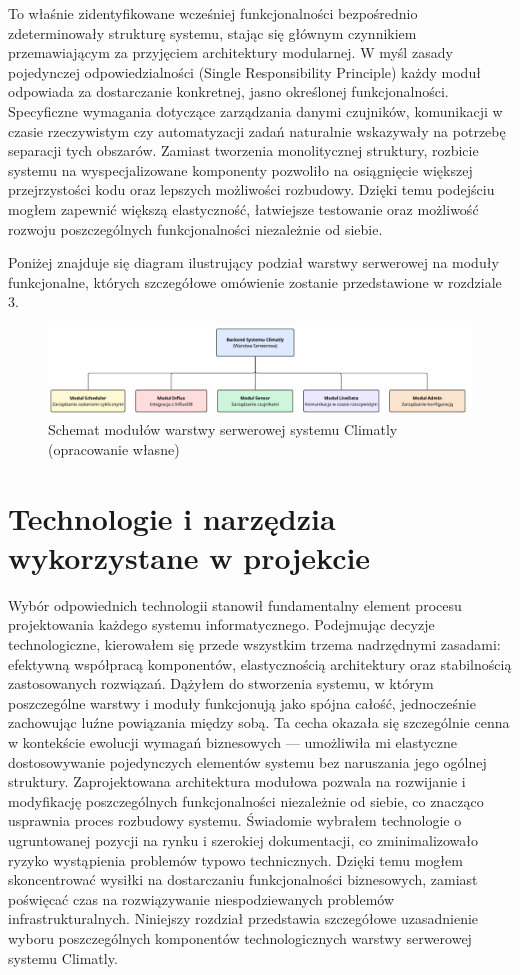 \documentclass[a4paper,12pt,openany]{book}
\begin{document}
To właśnie zidentyfikowane wcześniej funkcjonalności bezpośrednio zdeterminowały strukturę systemu, stając się głównym czynnikiem przemawiającym za przyjęciem architektury modularnej. W myśl zasady pojedynczej odpowiedzialności (Single Responsibility Principle) każdy moduł odpowiada za dostarczanie konkretnej, jasno określonej funkcjonalności. Specyficzne wymagania dotyczące zarządzania danymi czujników, komunikacji w czasie rzeczywistym czy automatyzacji zadań naturalnie wskazywały na potrzebę separacji tych obszarów. Zamiast tworzenia monolitycznej struktury, rozbicie systemu na wyspecjalizowane komponenty pozwoliło na osiągnięcie większej przejrzystości kodu oraz lepszych możliwości rozbudowy. Dzięki temu podejściu mogłem zapewnić większą elastyczność, łatwiejsze testowanie oraz możliwość rozwoju poszczególnych funkcjonalności niezależnie od siebie.

Poniżej znajduje się diagram ilustrujący podział warstwy serwerowej na moduły funkcjonalne, których szczegółowe omówienie zostanie przedstawione w rozdziale 3.

\begin{figure}[H]
    \centering
    \includegraphics[width=1\textwidth]{Climatly-modules.pdf}
    \caption{Schemat modułów warstwy serwerowej systemu Climatly (opracowanie własne)}
    \label{fig:moduly---systemu}
\end{figure}

\chapter{Technologie i narzędzia wykorzystane w projekcie}

Wybór odpowiednich technologii stanowił fundamentalny element procesu projektowania każdego systemu informatycznego. Podejmując decyzje technologiczne, kierowałem się przede wszystkim trzema nadrzędnymi zasadami: efektywną współpracą komponentów, elastycznością architektury oraz stabilnością zastosowanych rozwiązań.
Dążyłem do stworzenia systemu, w którym poszczególne warstwy i moduły funkcjonują jako spójna całość, jednocześnie zachowując luźne powiązania między sobą. Ta cecha okazała się szczególnie cenna w kontekście ewolucji wymagań biznesowych --- umożliwiła mi elastyczne dostosowywanie pojedynczych elementów systemu bez naruszania jego ogólnej struktury. Zaprojektowana architektura modułowa pozwala na rozwijanie i modyfikację poszczególnych funkcjonalności niezależnie od siebie, co znacząco usprawnia proces rozbudowy systemu.
Świadomie wybrałem technologie o ugruntowanej pozycji na rynku i szerokiej dokumentacji, co zminimalizowało ryzyko wystąpienia problemów typowo technicznych. Dzięki temu mogłem skoncentrować wysiłki na dostarczaniu funkcjonalności biznesowych, zamiast poświęcać czas na rozwiązywanie niespodziewanych problemów infrastrukturalnych. Niniejszy rozdział przedstawia szczegółowe uzasadnienie wyboru poszczególnych komponentów technologicznych warstwy serwerowej systemu Climatly.
\end{document}
